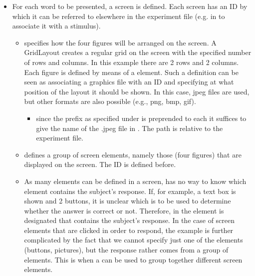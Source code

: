 \begin{itemize}
\item {} For each word to be presented, a screen is
defined. Each screen has an ID by which it can be referred to
elsewhere in the experiment file (e.g. in  to
associate it with a stimulus).
\begin{itemize}

\item {} specifies how the four figures will be
arranged on the screen. A GridLayout creates a regular grid on the
screen with the specified number of rows and columns. In this
example there are 2 rows and 2 columns. Each figure is defined by
means of a  element. Such a definition can be
seen as associating a graphics file with an ID and specifying at
what position of the layout it should be shown. In this case, jpeg
files are used, but other formats are also possible (e.g., png,
bmp, gif).

\begin{itemize}
\item {}


 since the prefix as specified under
 is preprended to each   it
suffices to give the name of the .jpeg file in . The
path is relative to the experiment file.

\end{itemize}
\end{itemize}
\begin{itemize}
\item {} defines a group of screen elements,
namely those (four figures) that are displayed on the screen. The
ID is defined before.

\item {} As many elements can be
defined in a screen, \apex has no way to know which element
contains the subject's response. If, for example, a text box is
shown and 2 buttons, it is unclear which is to be used to
determine whether the answer is correct or not. Therefore, in
 the element is designated that
contains the subject's response. In the case of screen elements
that are clicked in order to respond, the example is further
complicated by the fact that we cannot specify just one of the
elements (buttons, pictures), but the response rather comes from a
group of elements. This is when a  can be
used to group together different screen elements.
\end{itemize}
\end{itemize}
  
  
  
 

